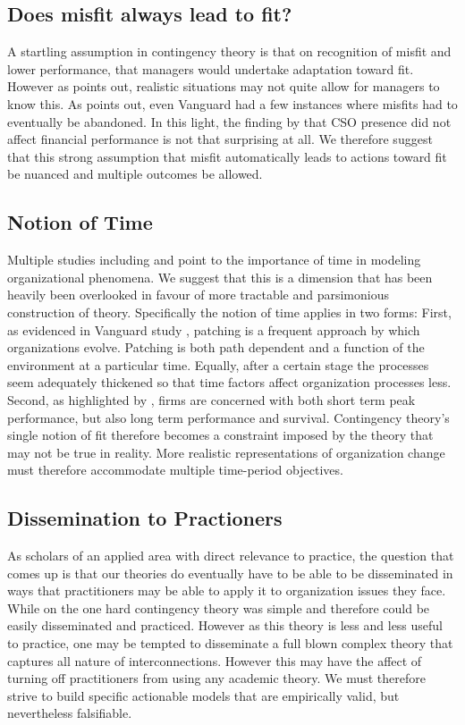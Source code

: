 \documentclass[12pt]{article}
\begin{document}
\subsection{Does misfit always lead to fit?}
A startling assumption in contingency theory is that on recognition of misfit and lower performance, that managers would undertake adaptation toward fit. However as \cite{Payne2006} points out, realistic situations may not quite allow for managers to know this. As \cite{Siggelkow2002} points out, even Vanguard had a few instances where misfits had to eventually be abandoned. In this light, the finding by \cite{Menz2014} that CSO presence did not affect financial performance is not that surprising at all. We therefore suggest that this strong assumption that misfit automatically leads to actions toward fit be nuanced and multiple outcomes be allowed.

\subsection{Notion of Time}
Multiple studies including \cite{Siggelkow2002} and \cite{Smith2011} point to the importance of time in modeling organizational phenomena. We suggest that this is a dimension that has been heavily been overlooked in favour of more tractable and parsimonious construction of theory. Specifically the notion of time applies in two forms: First, as evidenced in Vanguard study \citep{Siggelkow2002}, patching is a frequent approach by which organizations evolve. Patching is both path dependent and a function of the environment at a particular time. Equally, after a certain stage the processes seem adequately thickened so that time factors affect organization processes less. Second, as highlighted by \cite{Smith2011}, firms are concerned with both short term peak performance, but also long term performance and survival. Contingency theory's single notion of fit therefore becomes a constraint imposed by the theory that may not be true in reality. More realistic representations of organization change must therefore accommodate multiple time-period objectives.

\subsection{Dissemination to Practioners}
As scholars of an applied area with direct relevance to practice, the question that comes up is that our theories do eventually have to be able to be disseminated in ways that practitioners may be able to apply it to organization issues they face. While on the one hard contingency theory was simple and therefore could be easily disseminated and practiced. However as this theory is less and less useful to practice, one may be tempted to disseminate a full blown complex theory that captures all nature of interconnections. However this may have the affect of turning off practitioners from using any academic theory. We must therefore strive to build specific actionable models that are empirically valid, but nevertheless falsifiable.
\end{document}
